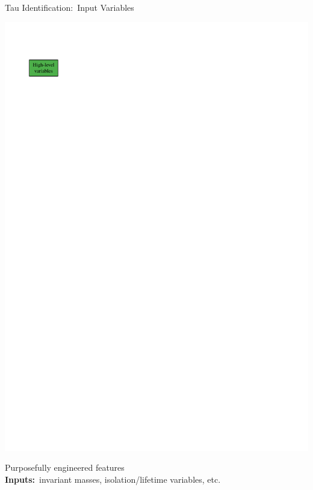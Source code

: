 \documentclass[11pt, xcolor={dvipsnames}, aspectratio=169, notes]{beamer}
\begin{document}
\begin{frame}{Tau Identification:\ Input Variables}

  \begin{minipage}[c][2.2cm][c]{0.25\textwidth}
    \centering

    \includegraphics[scale=1]{tauid/high_level_icon}
  \end{minipage}%
  \begin{minipage}[c][2.2cm][c]{0.75\textwidth}
    Purposefully engineered features\\[0.5\baselineskip]
    \textbf{Inputs:}\ invariant masses, isolation/lifetime variables, etc.
  \end{minipage}%

  \pause

  \begin{minipage}[c][2.2cm][c]{0.25\textwidth}
    \centering


\end{minipage}
\end{frame}
\end{document}

